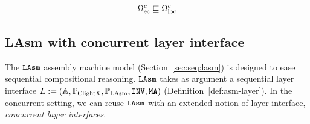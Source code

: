 \begin{lemma}
\[\Omega_{\text{ec}}^c \sqsubseteq
\Omega_{\text{loc}}^{c}\]

\end{lemma}




\subsection{LAsm with concurrent layer interface}
\label{sec:con:lasm}




The ${\texttt{LAsm}}$ assembly machine model (\cf Section~\ref{sec:seq:lasm}) is
designed to ease sequential compositional reasoning. ${\texttt{LAsm}}$ takes as
argument a sequential layer interface $L := (\mathbb{A}, \mathbb{P}_{\mathrm{ClightX}}, \mathbb{P}_{\mathrm{LAsm}}, {\texttt{INV}}, {\texttt{MA}})$
(\cf Definition~\ref{def:asm-layer}).
In the concurrent setting, we can reuse ${\texttt{LAsm}}$ with an extended
notion of layer interface, \emph{concurrent layer interfaces}.

